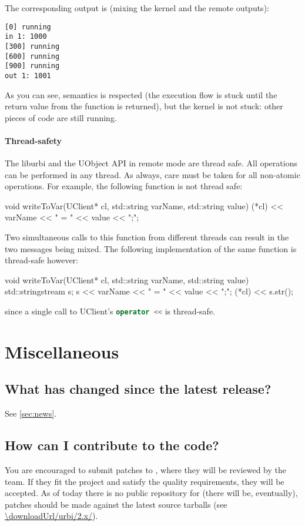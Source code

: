 The corresponding output is (mixing the kernel and the remote outputs):

\begin{verbatim}
[0] running
in 1: 1000
[300] running
[600] running
[900] running
out 1: 1001
\end{verbatim}

As you can see, \urbi semantics is respected (the execution flow is
stuck until the return value from the function is returned), but the
kernel is not stuck: other pieces of code are still running.

\paragraph{Thread-safety}

The liburbi and the UObject API in remote mode are thread safe. All
operations can be performed in any thread. As always, care must be
taken for all non-atomic operations. For example, the following
function is not thread safe:

\begin{cxx}
void
writeToVar(UClient* cl, std::string varName, std::string value)
{
  (*cl) << varName << " = " << value << ";";
}
\end{cxx}

Two simultaneous calls to this function from different threads can
result in the two messages being mixed.  The following implementation
of the same function is thread-safe however:

\begin{cxx}
void
writeToVar(UClient* cl, std::string varName, std::string value)
{
  std::stringstream s;
  s << varName << " = " << value << ";";
  (*cl) << s.str();
}
\end{cxx}

\noindent
since a single call to UClient's \lstinline[language=C++]|operator <<|
is thread-safe.


\section{Miscellaneous}
\subsection{What has changed since the latest release?}
See \autoref{sec:news}.

\subsection{How can I contribute to the code?}
\label{sec:faq:contribute}
You are encouraged to submit patches to ,
where they will be reviewed by the \urbi team.  If they fit the project and
satisfy the quality requirements, they will be accepted.  As of today there
is no public repository for \usdk (there will be, eventually), patches
should be made against the latest source tarballs (see
\url{\downloadUrl/urbi/2.x/}).

